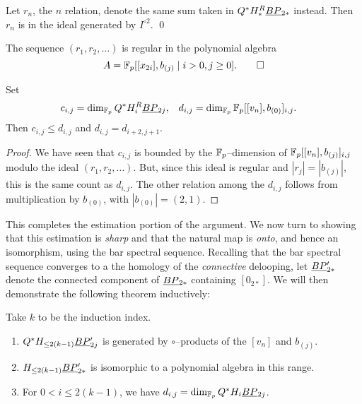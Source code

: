 \begin{corollary}
Let $r_n$, the $n${\th} relation, denote the same sum taken in $Q^* H_*^R \smash{\underline{BP}}_{2*}$ instead.  Then $r_n$ is in the ideal generated by $I^{\circ 2}$. \qed {}
\end{corollary}

\begin{lemma}
The sequence $(r_1, r_2, \ldots)$ is regular in the polynomial algebra \[A = \mathbb F_p[[x_{2i}], b_{(j)} \mid i > 0, j \ge 0]. \qed\] 
\end{lemma}

\begin{lemma}
Set
\begin{align*}
c_{i,j} & = \dim_{\mathbb F_p} Q^* H_i^R \smash{\underline{BP}}_{2j}, &
d_{i,j} & = \dim_{\mathbb F_p} \mathbb F_p[[v_n], b_{(0)}]_{i,j}.
\end{align*}
Then $c_{i,j} \le d_{i,j}$ and $d_{i,j} = d_{i+2,j+1}$.
\end{lemma}
\begin{proof}
We have seen that $c_{i,j}$ is bounded by the $\mathbb F_p$--dimension of $\mathbb F_p[[v_n], b_{(j)}]_{i,j}$ modulo the ideal $(r_1, r_2, \ldots)$.  But, since this ideal is regular and $|r_j| = |b_{(j)}|$, this is the same count as $d_{i,j}$.  The other relation among the $d_{i,j}$ follows from multiplication by $b_{(0)}$, with $|b_{(0)}| = (2, 1)$.
\end{proof}

This completes the estimation portion of the argument.  We now turn to showing that this estimation is \emph{sharp} and that the natural map is \emph{onto}, and hence an isomorphism, using the bar spectral sequence.  Recalling that the bar spectral sequence converges to a the homology of the \emph{connective} delooping, let $\smash{\underline{BP}}_{2*}'$ denote the connected component of $\smash{\underline{BP}}_{2*}$ containing $[0_{2*}]$.  We will then demonstrate the following theorem inductively:
\begin{theorem}\label{HFpBPCooperationsInduction}
Take $k$ to be the induction index.
\begin{enumerate}
\item $Q^* H_{\le 2(k-1)} \smash{\underline{BP}}_{2j}'$ is generated by $\circ$--products of the $[v_n]$ and $b_{(j)}$.
\item $H_{\le 2(k-1)} \smash{\underline{BP}}_{2*}'$ is isomorphic to a polynomial algebra in this range.
\item For $0 < i \le 2(k-1)$, we have $d_{i,j} = \dim_{\mathbb F_p} Q^* H_i \smash{\underline{BP}}_{2j}$.
\end{enumerate}
\end{theorem}

